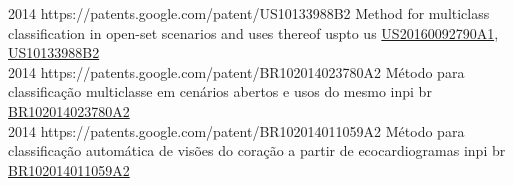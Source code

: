 \begin{publications}
  {
  }
  {2014}
  {https://patents.google.com/patent/US10133988B2}
  {Method for multiclass classification in open-set scenarios and uses thereof}
  {uspto}
  {us}
  {\href{https://patents.google.com/patent/US20160092790A1}{US20160092790A1}, \href{https://patents.google.com/patent/US10133988B2}{US10133988B2}}
  {}
  {}
  {}
  \\

  {
  }
  {2014}
  {https://patents.google.com/patent/BR102014023780A2}%
  {Método para classificação multiclasse em cenários abertos e usos do mesmo}
  {inpi}
  {br}
  {\href{https://patents.google.com/patent/BR102014023780A2}{BR102014023780A2}}
  {}
  {}
  {}
  \\

  {
  }
  {2014}
  {https://patents.google.com/patent/BR102014011059A2}
  {Método para classificação automática de visões do coração a partir de ecocardiogramas}
  {inpi}
  {br}
  {\href{https://patents.google.com/patent/BR102014011059A2}{BR102014011059A2}}
  {}
  {}
  {}
  \\

\end{publications}





